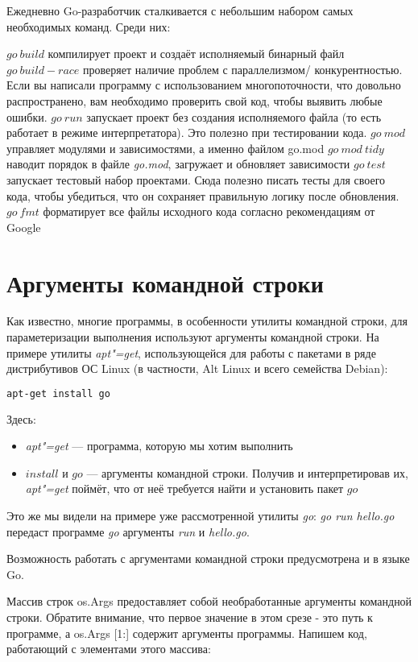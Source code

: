 \documentclass{book}
\begin{document}
Ежедневно Go-разработчик сталкивается с небольшим набором самых необходимых команд. Среди них:
\begin{outline}
    \1 $go~build$ компилирует проект и создаёт исполняемый бинарный файл
    \2 $go~build-race$ проверяет наличие проблем с параллелизмом/ конкурентностью. Если вы написали программу с использованием многопоточности, что довольно распространено, вам необходимо проверить свой код, чтобы выявить любые ошибки.
    \1 $go~run$ запускает проект без создания исполняемого файла (то есть работает в режиме интерпретатора). Это полезно при тестировании кода.
    \1 $go~mod$ управляет модулями и зависимостями, а именно файлом go.mod
    \2 $go~mod~tidy$ наводит порядок в файле \textit{go.mod}, загружает и обновляет зависимости
    \1 $go~test$ запускает тестовый набор проектами. Сюда полезно писать тесты для своего кода, чтобы убедиться, что он сохраняет правильную логику после обновления.
    \1 $go~fmt$ форматирует все файлы исходного кода согласно рекомендациям от Google
\end{outline}

\section{Аргументы командной строки}
Как известно, многие программы, в особенности утилиты командной строки, для параметеризации выполнения используют аргументы командной строки. На примере утилиты \textit{apt"=get}, использующейся для работы с пакетами в ряде дистрибутивов ОС Linux (в частности, Alt Linux и всего семейства Debian):
\begin{lstlisting}[language=sh]
    apt-get install go
\end{lstlisting}
Здесь:
\begin{itemize}
    \item \textit{apt"=get} --- программа, которую мы хотим выполнить
    \item $install$ и $go$ --- аргументы командной строки. Получив и интерпретировав их, \textit{apt"=get} поймёт, что от неё требуется найти и установить пакет $go$
\end{itemize}

Это же мы видели на примере уже рассмотренной утилиты \textit{go}: \textit{go run hello.go} передаст программе \textit{go} аргументы \textit{run} и \textit{hello.go}.

Возможность работать с аргументами командной строки предусмотрена и в языке Go.

Массив строк os.Args предоставляет собой необработанные аргументы командной строки. Обратите внимание, что первое значение в этом срезе - это путь к программе, а os.Args [1:] содержит аргументы программы. Напишем код, работающий с элементами этого массива:
\end{document}
